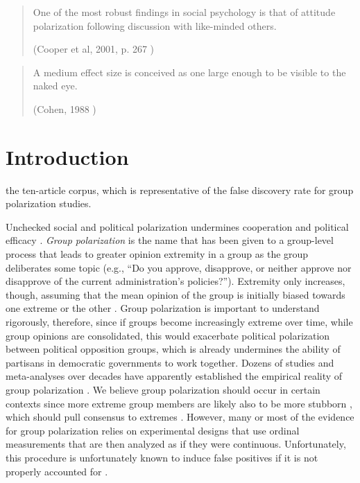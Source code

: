 \documentclass[
  abstract]{article}
\begin{document}
\begin{quote}
One of the most robust findings in social psychology is that of attitude polarization 
following discussion with like-minded others.
\par\raggedleft(Cooper et al, 2001, p. 267 \cite[p. 267]{Cooper2001})
\end{quote}

\begin{quote}
A medium effect size is conceived as one large enough to be visible to the naked eye.
\par\raggedleft(Cohen, 1988 \cite[p. 26]{CohenBook1988})
\end{quote}


\section{Introduction}\label{introduction}

the ten-article corpus, which is representative of the
false discovery rate for group polarization studies.

Unchecked social and political polarization undermines cooperation and political
efficacy \autocite{Mason2018UncivilAgreementBook,Klein2020}.  \emph{Group
polarization} is the name that has been given to a group-level process that leads
to greater opinion extremity in a group as the group deliberates some topic (e.g.,
``Do you approve, disapprove, or neither approve nor disapprove of the current
administration's policies?''). Extremity only increases, though, assuming that the
mean opinion of the group is initially biased towards one extreme or the other
\autocite{Brown1986,Brown2020}. Group polarization is important to understand
rigorously, therefore, since if groups become increasingly extreme over time,
while group opinions are consolidated, this would exacerbate political
polarization between political opposition groups, which is already undermines the
ability of partisans in democratic governments to work together. Dozens of studies
and meta-analyses over decades have apparently established the empirical reality
of group polarization
\autocite{Moscovici1969,Myers1970,Isenberg1986,Sunstein2009,Sunstein2019}
\autocite[Ch. 5]{Brown2000}. We believe group polarization should occur in certain
contexts since more extreme group members are likely also to be more stubborn
\autocite{Guazzini2015,Lewandowsky2019}, which should pull consensus to extremes
\autocite{Turner2020}. However, many or most of the evidence for group
polarization relies on experimental designs that use ordinal measurements that are
then analyzed as if they were continuous. Unfortunately, this procedure is
unfortunately known to induce false positives if it is not properly accounted for
\autocite{Liddell2018}.
\end{document}
